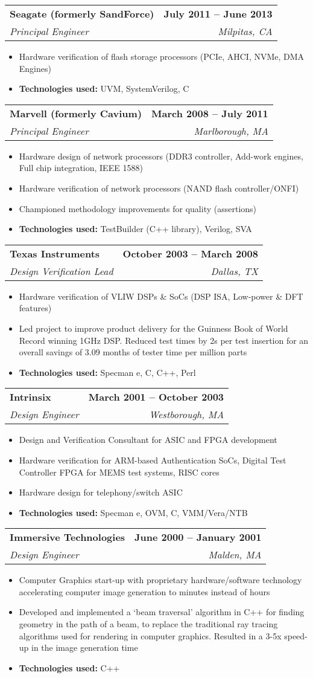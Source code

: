 \documentclass[letterpaper,11pt]{article}
\makeatletter
\newcommand{\resumeItem}[1]{
  \item\small{
    {#1 \vspace{-2pt}}
  }
}
\newcommand{\resumeSubheading}[4]{
  \vspace{-2pt}\item
    \begin{tabular*}{1.0\textwidth}[t]{l@{\extracolsep{\fill}}r}
      \textbf{#1} & \textbf{\small #2} \\
      \textit{\small#3} & \textit{\small #4} \\
    \end{tabular*}\vspace{-7pt}
}
\newcommand{\resumeItemListStart}{\begin{itemize}}
\newcommand{\resumeItemListEnd}{\end{itemize}\vspace{-5pt}}
\makeatother
\begin{document}
    \resumeSubheading
      {Seagate (formerly SandForce)}{July 2011 -- June 2013}
      {Principal Engineer}{Milpitas, CA}
      \resumeItemListStart
        \resumeItem{Hardware verification of flash storage processors (PCIe, AHCI, NVMe, DMA Engines)}
        \resumeItem{\textbf{Technologies used:} UVM, SystemVerilog, C}
      \resumeItemListEnd

    \resumeSubheading
      {Marvell (formerly Cavium)}{March 2008 -- July 2011}
      {Principal Engineer}{Marlborough, MA}
      \resumeItemListStart
        \resumeItem{Hardware design of network processors (DDR3 controller, Add-work engines, Full chip integration, IEEE 1588)}
        \resumeItem{Hardware verification of network processors (NAND flash controller/ONFI)}
        \resumeItem{Championed methodology improvements for quality (assertions)}
        \resumeItem{\textbf{Technologies used:} TestBuilder (C++ library), Verilog, SVA}
      \resumeItemListEnd        

    \resumeSubheading
      {Texas Instruments}{October 2003 -- March 2008}
      {Design Verification Lead}{Dallas, TX}
      \resumeItemListStart
        \resumeItem{Hardware verification of VLIW DSPs \& SoCs (DSP ISA, Low-power \& DFT features)}
        \resumeItem{Led project to improve product delivery for the Guinness Book of World Record winning 1GHz DSP. Reduced test times by 2s per test insertion for an overall savings of 3.09 months of tester time per million parts}
        \resumeItem{\textbf{Technologies used:} Specman e, C, C++, Perl}
      \resumeItemListEnd      

    \resumeSubheading
      {Intrinsix}{March 2001 -- October 2003}
      {Design Engineer}{Westborough, MA}
      \resumeItemListStart
        \resumeItem{Design and Verification Consultant for ASIC and FPGA development}
        \resumeItem{Hardware verification for ARM-based Authentication SoCs, Digital Test Controller FPGA for MEMS test systems, RISC cores}
        \resumeItem{Hardware design for telephony/switch ASIC}
        \resumeItem{\textbf{Technologies used:} Specman e, OVM, C, VMM/Vera/NTB}
      \resumeItemListEnd

    \resumeSubheading
      {Immersive Technologies}{June 2000 -- January 2001}
      {Design Engineer}{Malden, MA}
      \resumeItemListStart
        \resumeItem{Computer Graphics start-up with proprietary hardware/software technology accelerating computer image generation to minutes instead of hours}
        \resumeItem{Developed and implemented a ‘beam traversal’ algorithm in C++ for finding geometry in the path of a beam, to replace the traditional ray tracing algorithms used for rendering in computer graphics. Resulted in a 3-5x speed-up in the image generation time}
        \resumeItem{\textbf{Technologies used:} C++}
      \resumeItemListEnd
    
\end{document}
